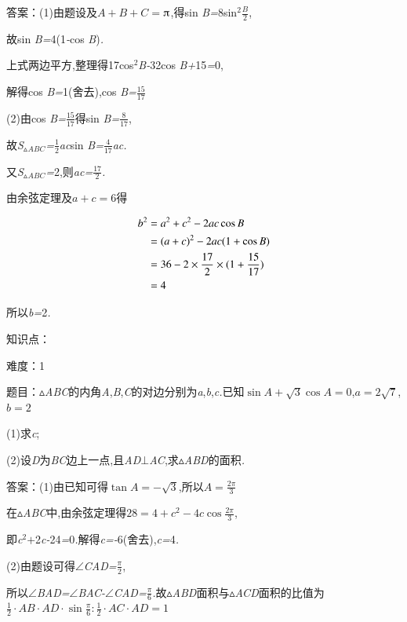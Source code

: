 \documentclass{article} %
\begin{document}
 答案：(1)由题设及$A+B+C=$$\piup$,得sin \textit{B=}8sin${}^{2}$$\frac{B}{2}$,

故sin \textit{B=}4(1\textit{-}cos \textit{B})\textit{.}

上式两边平方,整理得17cos${}^{2}$\textit{B-}32cos \textit{B+}15\textit{=}0,

解得cos \textit{B=}1(舍去),cos \textit{B=}$\frac{15}{17}$

(2)由cos \textit{B=}$\frac{15}{17}$得sin \textit{B=}$\frac{8}{17}$,

故\textit{S}${}_{\vartriangle }$\textit{${}_{ABC}$=}$\frac{1}{2}$\textit{ac}sin \textit{B=}$\frac{4}{17}$\textit{ac.}

又\textit{S}${}_{\vartriangle }$\textit{${}_{ABC}$=}2,则\textit{ac=}$\frac{17}{2}$\textit{.}

由余弦定理及$a+c=6$得

\begin{align}
\notag
b^2&=a^2+c^2-2ac\cos B\\\notag
&={(a+c)}^2-2ac(1+\cos B)\\\notag
&=36-2\times\frac{17}{2}\times(1+\frac{15}{17})\\\notag
&=4
\end{align}

所以\textit{b=}2\textit{.}

知识点：

难度：1

 题目：$\mathrm{\vartriangle}$\textit{ABC}的内角\textit{A},\textit{B},\textit{C}的对边分别为\textit{a},\textit{b},\textit{c.}已知$\sin A+\sqrt{3}\cos A=0$,$a=2\sqrt{7}$,$b=2$

 (1)求\textit{c};

 (2)设\textit{D}为\textit{BC}边上一点,且\textit{AD}$\mathrm{\bot}$\textit{AC},求$\mathrm{\vartriangle}$\textit{ABD}的面积\textit{.}

 答案：(1)由已知可得$\tan A=-\sqrt{3}$,所以$A=\frac{2\pi}{3}$

在$\mathrm{\vartriangle}$\textit{ABC}中,由余弦定理得$28=4+c^2-4c\cos\frac{2\pi}{3}$,

即\textit{c}${}^{2}$\textit{$+$}2\textit{c-}24\textit{=}0\textit{.}解得\textit{c=-}6(舍去),\textit{c=}4\textit{.}

(2)由题设可得$\mathrm{\angle}$\textit{CAD=}$\frac{\pi}{2}$,

所以$\mathrm{\angle}$\textit{BAD=}$\mathrm{\angle}$\textit{BAC-}$\mathrm{\angle}$\textit{CAD=}$\frac{\pi}{6}$\textit{.}故$\mathrm{\vartriangle}$\textit{ABD}面积与$\mathrm{\vartriangle}$\textit{ACD}面积的比值为$\frac{1}{2}\cdot AB\cdot AD\cdot \sin\frac{\pi}{6} : \frac{1}{2}\cdot AC\cdot AD=1$
\end{document}

